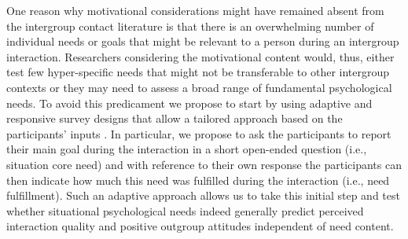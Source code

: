 \documentclass[man, 12pt, a4paper, mask]{apa7}
\theoremstyle{break}
\theoremstyle{plain}
\begin{document}
One reason why motivational considerations might have remained absent from the intergroup contact literature is that there is an overwhelming number of individual needs or goals that might be relevant to a person during an intergroup interaction. Researchers considering the motivational content would, thus, either test few hyper-specific needs that might not be transferable to other intergroup contexts or they may need to assess a broad range of fundamental psychological needs. To avoid this predicament we propose to start by using adaptive and responsive survey designs that allow a tailored approach based on the participants' inputs \citep[e.g.,][]{Tourangeau2017}. In particular, we propose to ask the participants to report their main goal during the interaction in a short open-ended question (i.e., situation core need) and with reference to their own response the participants can then indicate how much this need was fulfilled during the interaction (i.e., need fulfillment). Such an adaptive approach allows us to take this initial step and test whether situational psychological needs indeed generally predict perceived interaction quality and positive outgroup attitudes independent of need content. 
\end{document}
